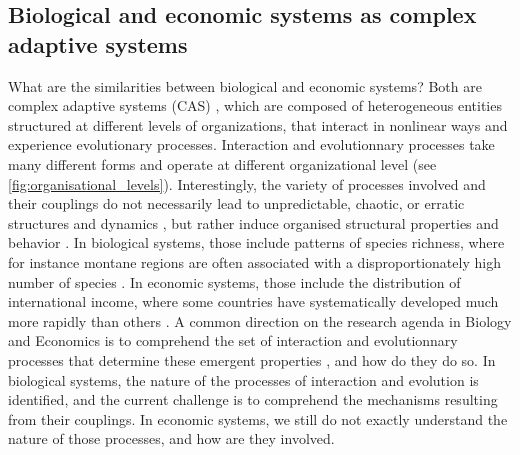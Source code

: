 \subsection{Biological and economic systems as complex adaptive systems}
What are the similarities between biological and economic systems? Both are complex adaptive systems (CAS) \citep{Levin2002}, which are composed of heterogeneous entities structured at different levels of organizations, that interact in nonlinear ways and experience evolutionary processes. 
% 
Interaction and evolutionnary processes take many different forms and operate at different organizational level \citep{Levin1998} (see \cref{fig:organisational_levels}).
% 
Interestingly, the variety of processes involved and their couplings do not necessarily lead to unpredictable, chaotic, or erratic structures and dynamics \citep{Olff2009}, but rather induce organised structural properties and behavior \citep{mitchell2009complexity}. 
% 
In biological systems, those include patterns of species richness, where for instance montane regions are often associated with a disproportionately high number of species \citep{Rahbek2019}. In economic systems, those include the distribution of international income, where some countries have systematically developed much more rapidly than others \citep{acemoglu2001colonial}. 
% 
A common direction on the research agenda in Biology and Economics is to comprehend the set of interaction and evolutionnary processes that determine these emergent properties \citep{Nordbotten2018}, and how do they do so.
% 
In biological systems, the nature of the processes of interaction and evolution is identified, and the current challenge is to comprehend the mechanisms resulting from their couplings.
% 
In economic systems, we still do not exactly understand the nature of those processes, and how are they involved. 
% 
% 
% 

